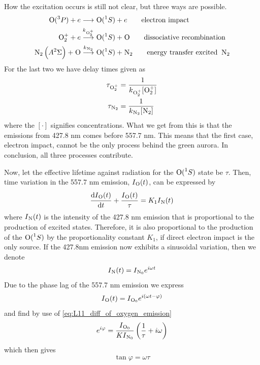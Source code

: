 How the excitation occurs is still not clear, but three ways are possible.
\begin{align*}
    \prescript{}{}{\textnormal{O}}(\prescript{3}{}{P})+e&\longrightarrow \prescript{}{}{\textnormal{O}}(\prescript{1}{}{S})+e\qquad\textnormal{electron impact}\\
    \prescript{}{}{\textnormal{O}}_2^++e&\overset{k_{\prescript{}{}{\textnormal{O}}_2^+}}{\longrightarrow} \prescript{}{}{\textnormal{O}}(\prescript{1}{}{S})+\prescript{}{}{\textnormal{O}}\qquad\textnormal{dissociative recombination}\\
    \prescript{}{}{\textnormal{N}}_2\left(A^2\Sigma\right)+\prescript{}{}{\textnormal{O}}&\overset{k_{\prescript{}{}{\textnormal{N}}_2}}{\longrightarrow} \prescript{}{}{\textnormal{O}}(\prescript{1}{}{S})+\prescript{}{}{\textnormal{N}}_2\qquad\textnormal{energy transfer excited }\prescript{}{}{\textnormal{N}}_2
\end{align*}
For the last two we have delay times given as
\begin{align*}
    \tau_{\prescript{}{}{\textnormal{O}}_2^+}&=\frac{1}{k_{\prescript{}{}{\textnormal{O}}_2^+}[\prescript{}{}{\textnormal{O}}_2^+]}\\
    \tau_{\prescript{}{}{\textnormal{N}}_2}&=\frac{1}{k_{\prescript{}{}{\textnormal{N}}_2}[\prescript{}{}{\textnormal{N}}_2]}
\end{align*}
where the \([\cdot]\) signifies concentrations. What we get from this is that the emissions from 427.8 nm comes before 557.7 nm. This means that the first case, electron impact, cannot be the only process behind the green aurora. In conclusion, all three processes contribute.

Now, let the effective lifetime against radiation for the \(\prescript{}{}{\textnormal{O}}(\prescript{1}{}{S})\) state be \(\tau \). Then, time variation in the 557.7 nm emission, \(I_{\prescript{}{}{\textnormal{O}}}(t)\), can be expressed by
\begin{equation}\label{eq:L11_diff_of_oxygen_emission}
    \frac{\textnormal{d}I_{\prescript{}{}{\textnormal{O}}}(t)}{\textnormal{d}t}+\frac{I_{\prescript{}{}{\textnormal{O}}}(t)}{\tau}=K_1I_{\prescript{}{}{\textnormal{N}}}(t)
\end{equation}
where \(I_{\prescript{}{}{\textnormal{N}}}(t)\) is the intensity of the 427.8 nm emission that is proportional to the production of excited states. Therefore, it is also proportional to the production of the \(\prescript{}{}{\textnormal{O}}(\prescript{1}{}{S})\) by the proportionality constant \(K_1\), if direct electron impact is the only source. If the 427.8nm emission now exhibits a sinusoidal variation, then we denote
\begin{equation*}
    I_{\prescript{}{}{\textnormal{N}}}(t)=I_{\prescript{}{}{\textnormal{N}}_0}e^{i\omega t}
\end{equation*}
Due to the phase lag of the 557.7 nm emission we express
\begin{equation*}
    I_{\prescript{}{}{\textnormal{O}}}(t)=I_{\prescript{}{}{\textnormal{O}}_0}e^{i\left(\omega t-\varphi\right)}
\end{equation*}
and find by use of \cref{eq:L11_diff_of_oxygen_emission}
\begin{equation*}
    e^{i\varphi}=\frac{I_{\prescript{}{}{\textnormal{O}}_0}}{KI_{\prescript{}{}{\textnormal{N}}_0}}\left(\frac{1}{\tau}+i\omega\right)
\end{equation*}
which then gives
\begin{equation}\label{eq:L11_bad_tan_varphi}
    \tan\varphi=\omega\tau
\end{equation}

